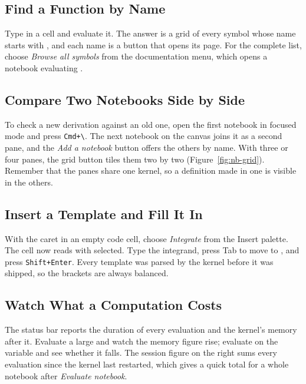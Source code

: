 \subsection*{Find a Function by Name}

Type  in a cell and evaluate it. The answer is a grid of every
symbol whose name starts with , and each name is a button that
opens its page. For the complete list, choose \emph{Browse all symbols} from
the documentation menu, which opens a notebook evaluating .

\subsection*{Compare Two Notebooks Side by Side}

To check a new derivation against an old one, open the first notebook in
focused mode and press \texttt{Cmd+\textbackslash}. The next notebook on the
canvas joins it as a second pane, and the \emph{Add a notebook} button
offers the others by name. With three or four panes, the grid button tiles
them two by two (Figure~\ref{fig:nb-grid}). Remember that the panes share one
kernel, so a definition made in one is visible in the others.

\subsection*{Insert a Template and Fill It In}

With the caret in an empty code cell, choose \emph{Integrate} from the Insert
palette. The cell now reads  with 
selected. Type the integrand, press Tab to move to , and press
\texttt{Shift+Enter}. Every template was parsed by the kernel before it was
shipped, so the brackets are always balanced.

\subsection*{Watch What a Computation Costs}

The status bar reports the duration of every evaluation and the kernel's
memory after it. Evaluate a large  and watch the memory figure rise;
evaluate  on the variable and see whether it falls. The session
figure on the right sums every evaluation since the kernel last restarted,
which gives a quick total for a whole notebook after \emph{Evaluate notebook}.

